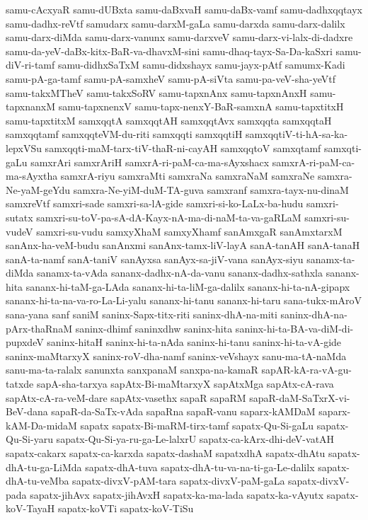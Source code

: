 {samu-cAcxyaR
samu-dUBxta
samu-daBxvaH
samu-daBx-vamf
samu-dadhxqqtayx
samu-dadhx-reVtf
samudarx
samu-darxM-gaLa
samu-darxda
samu-darx-dalilx
samu-darx-diMda
samu-darx-vanunx
samu-darxveV
samu-darx-vi-lalx-di-dadxre
samu-da-yeV-daBx-kitx-BaR-va-dhavxM-sini
samu-dhaq-tayx-Sa-Da-kaSxri
samu-diV-ri-tamf
samu-didhxSaTxM
samu-didxshayx
samu-jayx-pAtf
samumx-Kadi
samu-pA-ga-tamf
samu-pA-samxheV
samu-pA-siVta
samu-pa-veV-sha-yeVtf
samu-takxMTheV
samu-takxSoRV
samu-tapxnAnx
samu-tapxnAnxH
samu-tapxnanxM
samu-tapxnenxV
samu-tapx-nenxY-BaR-samxnA
samu-tapxtitxH
samu-tapxtitxM
samxqqtA
samxqqtAH
samxqqtAvx
samxqqta
samxqqtaH
samxqqtamf
samxqqteVM-du-riti
samxqqti
samxqqtiH
samxqqtiV-ti-hA-sa-ka-lepxVSu
samxqqti-maM-tarx-tiV-thaR-ni-cayAH
samxqqtoV
samxqtamf
samxqti-gaLu
samxrAri
samxrAriH
samxrA-ri-paM-ca-ma-sAyxshacx
samxrA-ri-paM-ca-ma-sAyxtha
samxrA-riyu
samxraMti
samxraNa
samxraNaM
samxraNe
samxra-Ne-yaM-geYdu
samxra-Ne-yiM-duM-TA-guva
samxranf
samxra-tayx-nu-dinaM
samxreVtf
samxri-sade
samxri-sa-lA-gide
samxri-si-ko-LaLx-ba-hudu
samxri-sutatx
samxri-su-toV-pa-sA-dA-Kayx-nA-ma-di-naM-ta-va-gaRLaM
samxri-su-vudeV
samxri-su-vudu
samxyXhaM
samxyXhamf
sanAmxgaR
sanAmxtarxM
sanAnx-ha-veM-budu
sanAnxmi
sanAnx-tamx-liV-layA
sanA-tanAH
sanA-tanaH
sanA-ta-namf
sanA-taniV
sanAyxsa
sanAyx-sa-jiV-vana
sanAyx-siyu
sanamx-ta-diMda
sanamx-ta-vAda
sananx-dadhx-nA-da-vanu
sananx-dadhx-sathxla
sananx-hita
sananx-hi-taM-ga-LAda
sananx-hi-ta-liM-ga-dalilx
sananx-hi-ta-nA-gipapx
sananx-hi-ta-na-va-ro-La-Li-yalu
sananx-hi-tanu
sananx-hi-taru
sana-tukx-mAroV
sana-yana
sanf
saniM
saninx-Sapx-titx-riti
saninx-dhA-na-miti
saninx-dhA-na-pArx-thaRnaM
saninx-dhimf
saninxdhw
saninx-hita
saninx-hi-ta-BA-va-diM-di-pupxdeV
saninx-hitaH
saninx-hi-ta-nAda
saninx-hi-tanu
saninx-hi-ta-vA-gide
saninx-maMtarxyX
saninx-roV-dha-namf
saninx-veVshayx
sanu-ma-tA-naMda
sanu-ma-ta-ralalx
sanunxta
sanxpanaM
sanxpa-na-kamaR
sapAR-kA-ra-vA-gu-tatxde
sapA-sha-tarxya
sapAtx-Bi-maMtarxyX
sapAtxMga
sapAtx-cA-rava
sapAtx-cA-ra-veM-dare
sapAtx-vasethx
sapaR
sapaRM
sapaR-daM-SaTxrX-vi-BeV-dana
sapaR-da-SaTx-vAda
sapaRna
sapaR-vanu
saparx-kAMDaM
saparx-kAM-Da-midaM
sapatx
sapatx-Bi-maRM-tirx-tamf
sapatx-Qu-Si-gaLu
sapatx-Qu-Si-yaru
sapatx-Qu-Si-ya-ru-ga-Le-lalxrU
sapatx-ca-kArx-dhi-deV-vatAH
sapatx-cakarx
sapatx-ca-karxda
sapatx-dashaM
sapatxdhA
sapatx-dhAtu
sapatx-dhA-tu-ga-LiMda
sapatx-dhA-tuva
sapatx-dhA-tu-va-na-ti-ga-Le-dalilx
sapatx-dhA-tu-veMba
sapatx-divxV-pAM-tara
sapatx-divxV-paM-gaLa
sapatx-divxV-pada
sapatx-jihAvx
sapatx-jihAvxH
sapatx-ka-ma-lada
sapatx-ka-vAyutx
sapatx-koV-TayaH
sapatx-koVTi
sapatx-koV-TiSu
}
